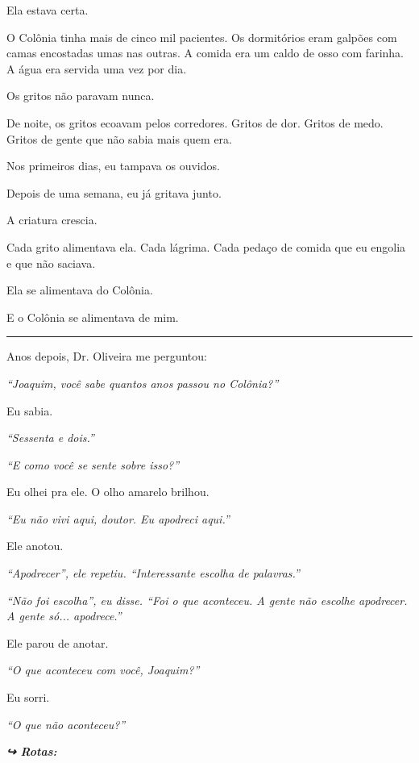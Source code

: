 \noindent Ela estava certa.

\noindent O Colônia tinha mais de cinco mil pacientes. Os dormitórios eram galpões com camas encostadas umas nas outras. A comida era um caldo de osso com farinha. A água era servida uma vez por dia.

\noindent Os gritos não paravam nunca.

\noindent De noite, os gritos ecoavam pelos corredores. Gritos de dor. Gritos de medo. Gritos de gente que não sabia mais quem era.

\noindent Nos primeiros dias, eu tampava os ouvidos.

\noindent Depois de uma semana, eu já gritava junto.

\noindent A criatura crescia.

\noindent Cada grito alimentava ela. Cada lágrima. Cada pedaço de comida que eu engolia e que não saciava.

\noindent Ela se alimentava do Colônia.

\noindent E o Colônia se alimentava de mim.

\vspace{0.5em}\noindent\rule{\textwidth}{0.5pt}\vspace{0.5em}

\noindent Anos depois, Dr. Oliveira me perguntou:

\noindent \textit{\textquotedblleft{}Joaquim, você sabe quantos anos passou no Colônia?\textquotedblright{}}

\noindent Eu sabia.

\noindent \textit{\textquotedblleft{}Sessenta e dois.\textquotedblright{}}

\noindent \textit{\textquotedblleft{}E como você se sente sobre isso?\textquotedblright{}}

\noindent Eu olhei pra ele. O olho amarelo brilhou.

\noindent \textit{\textquotedblleft{}Eu não vivi aqui, doutor. Eu apodreci aqui.\textquotedblright{}}

\noindent Ele anotou.

\noindent \textit{\textquotedblleft{}Apodrecer\textquotedblright{}\textit{, ele repetiu. }\textquotedblleft{}Interessante escolha de palavras.\textquotedblright{}}

\noindent \textit{\textquotedblleft{}Não foi escolha\textquotedblright{}\textit{, eu disse. }\textquotedblleft{}Foi o que aconteceu. A gente não escolhe apodrecer. A gente só... apodrece.\textquotedblright{}}

\noindent Ele parou de anotar.

\noindent \textit{\textquotedblleft{}O que aconteceu com você, Joaquim?\textquotedblright{}}

\noindent Eu sorri.

\noindent \textit{\textquotedblleft{}O que não aconteceu?\textquotedblright{}}

\vspace{0.5em}
\noindent\textit{\textbf{↪ Rotas:}  \rotasep {} \rotasep {}}